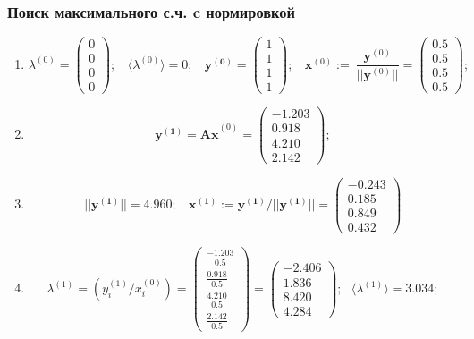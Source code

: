\subsubsection{Поиск максимального с.ч. c нормировкой}
\begin{enumerate}
\item $$
    \lambda^{(0)} =\begin{pmatrix}0\\0\\0\\0\end{pmatrix}; ~~~~
    \langle\lambda^{(0)}\rangle = 0;~~~~
    \mathbf{y^{(0)}} =\begin{pmatrix}1\\1\\1\\1\end{pmatrix};~~~~
    \mathbf{x}^{(0)}:=~\dfrac{\mathbf{y}^{(0)}}{||\mathbf{y}^{(0)}||} = \begin{pmatrix}0.5\\0.5\\0.5\\0.5\end{pmatrix};$$

\item $$
    \mathbf{y^{(1)} =Ax}^{(0)} = \begin{pmatrix}-1.203\\0.918\\4.210\\2.142\end{pmatrix};$$

\item $$
     ||\mathbf{y^{(1)}}|| = 4.960; ~~~~
     \mathbf{x^{(1)}}:=\mathbf{y^{(1)}}/||\mathbf{y^{(1)}}|| =
     \begin{pmatrix}-0.243\\0.185\\0.849\\0.432\end{pmatrix}$$

\item $$
    \lambda^{(1)} =\left( y^{(1)}_i / x^{(0)}_i \right) =
    \begin{pmatrix} \frac{-1.203}{0.5}\\\frac{0.918}{0.5}\\\frac{4.210}{0.5}\\\frac{2.142}{0.5}\end{pmatrix}=
    \begin{pmatrix} -2.406\\1.836\\8.420\\4.284\end{pmatrix}; ~~~
    \langle\lambda^{(1)}\rangle = 3.034;$$


\end{enumerate}
